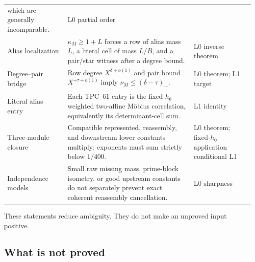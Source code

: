 \begin{center}
\begin{tabular}{>{\raggedright\arraybackslash}p{}
                >{\raggedright\arraybackslash}p{}
                >{\raggedright\arraybackslash}p{}}
  which are generally incomparable.
& L0 partial order\\
\addlinespace
Alias localization
& \(\kappa_M\ge1+L\) forces a row of alias mass \(L\), a literal cell of
  mass \(L/B\), and a pair/star witness after a degree bound.
& L0 inverse theorem\\
\addlinespace
Degree--pair bridge
& Row degree \(X^{\delta+o(1)}\) and pair bound
  \(X^{-\tau+o(1)}\) imply
  \(\nu_M\le(\delta-\tau)_+\).
& L0 theorem; L1 target\\
\addlinespace
Literal alias entry
& Each TPC--61 entry is the fixed-\(h_0\) weighted two-affine M\"obius
  correlation, equivalently its determinant-cell sum.
& L1 identity\\
\addlinespace
Three-module closure
& Compatible represented, reassembly, and downstream lower constants
  multiply; exponents must sum strictly below \(1/400\).
& L0 theorem; fixed-\(h_0\) application conditional L1\\
\addlinespace
Independence models
& Small raw missing mass, prime-block isometry, or good upstream constants
  do not separately prevent exact coherent reassembly cancellation.
& L0 sharpness\\
\bottomrule
\end{tabular}
\end{center}

These statements reduce ambiguity.  They do not make an unproved input
positive.

\subsection{What is not proved}

